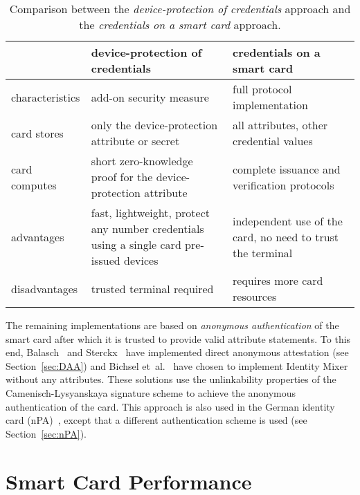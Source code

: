 \begin{table}
  \centering
  \caption{Comparison between the \emph{device-protection of credentials}
    approach and the \emph{credentials on a smart card} approach.}
  \label{tbl:approaches}
  \renewcommand{\tabcolsep}{1.25mm}
  \renewcommand{\arraystretch}{1.25}
  \begin{tabular}{l|p{47mm}|p{47mm}|}
     & device-protection of credentials & credentials on a smart card \\\hline
    characteristics &
      add-on security measure &
      full protocol implementation \\\hline
    card stores &
      only the device-protection attribute or secret &
      all attributes, other credential values \\\hline
    card computes &
      short zero-knowledge proof for the device-protection attribute &
      complete issuance and verification protocols \\\hline
    advantages &
      fast, lightweight, protect any number credentials
        using a single card pre-issued devices &
      independent use of the card, no need to trust the terminal \\\hline
    disadvantages &
      trusted terminal required &
      requires more card resources \\\hline
  \end{tabular}
\end{table}

The remaining implementations are based on \emph{anonymous authentication} of
the smart card after which it is trusted to provide valid attribute statements.
To this end, Balasch~\cite{Balasch2008} and Sterckx~\cite{Sterckx09} have
implemented direct anonymous attestation (see Section~\ref{sec:DAA}) and
Bichsel et~al.~\cite{BichselCGS2009} have chosen to implement Identity Mixer
without any attributes. These solutions use the unlinkability properties of the
Camenisch-Lysyanskaya signature scheme to achieve the anonymous authentication
of the card. This approach is also used in the German identity card (nPA)~\cite{Kugler2010}, except that
a different authentication scheme is used (see Section~\ref{sec:nPA}).

\section{Smart Card Performance\label{sec:perf-comparison}}

